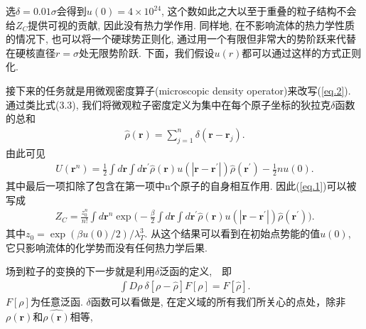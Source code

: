 选$\delta=0.01\sigma$会得到$u(0)=4\times10^{24}$,
这个数如此之大以至于重叠的粒子结构不会给$Z_C$提供可视的贡献, 因此没有热力学作用.
同样地, 在不影响流体的热力学性质的情况下, 也可以将一个硬球势正则化, 
通过用一个有限但非常大的势阶跃来代替在硬核直径$r=\sigma$处无限势阶跃.
下面，我们假设$u(r)$都可以通过这样的方式正则化.
\par
接下来的任务就是用微观密度算子(microscopic density
operator)来改写(\ref{eq.2}). 通过类比式(3.3),
我们将微观粒子密度定义为集中在每个原子坐标的狄拉克$\delta$函数的总和
\label{subsec.equations}
   \begin{equation}
       \begin{aligned}
           \hat{\rho}(\bm{r})=\sum_{j=1}^{n} \delta(\bm{r}-\bm{r}_j).
     \end{aligned}
       \label{eq.4}
    \end{equation}
由此可见
\label{subsec.equations}
   \begin{equation}
       \begin{aligned}
         U(\bm{r}^n)=\frac{1}{2} \int d\bm{r} \int
           d\bm{r^{'}}\hat{\rho}(\bm{r})u(|\bm{r}-\bm{r^{'}}|)\hat{\rho}(\bm{r^{'}})-\frac{1}{2}nu(0).
     \end{aligned}
       \label{eq.5}
    \end{equation}
其中最后一项扣除了包含在第一项中n个原子的自身相互作用.
因此(\ref{eq.1})可以被写成
\label{subsec.equations}
   \begin{equation}
       \begin{aligned}
           Z_C=\frac{z_0^n}{n!} \int d\bm{r}^n \exp \big( -\frac{\beta}{2}\int d\bm{r}\int
           d\bm{r^{'}}\hat{\rho}(\bm{r})u(|\bm{r}-\bm{r^{'}}|)\hat{\rho}(\bm{r^{'}})
           \big).
     \end{aligned}
       \label{eq.6}
    \end{equation}
其中$z_0=\exp(\beta u(0)/2)/{\lambda_T^3}$.
从这个结果可以看到在初始点势能的值$u(0)$,
它只影响流体的化学势而没有任何热力学后果.
\par
场到粒子的变换的下一步就是利用$\delta$泛函的定义,　即
\label{subsec.equations}
   \begin{equation}
       \begin{aligned}
           \int D\rho\ \delta[\rho-\hat{\rho}]F[\rho]=F[\hat{\rho}].
         \end{aligned}
       \label{eq.7}
    \end{equation}
$F[\rho]$为任意泛函.
$\delta$函数可以看做是,
在定义域的所有我们所关心的点处，除非$\rho(\bm{r})$和$\hat{\rho(\bm{r})}$相等,
